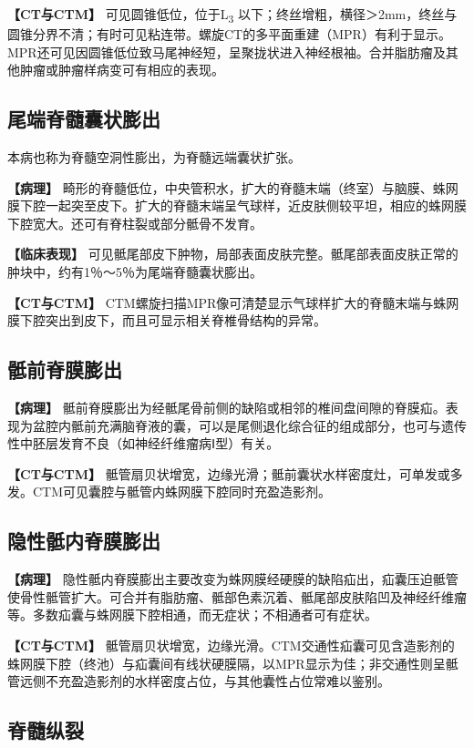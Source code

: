 \textbf{【CT与CTM】} 可见圆锥低位，位于L\textsubscript{3}
以下；终丝增粗，横径＞2mm，终丝与圆锥分界不清；有时可见粘连带。螺旋CT的多平面重建（MPR）有利于显示。MPR还可见因圆锥低位致马尾神经短，呈聚拢状进入神经根袖。合并脂肪瘤及其他肿瘤或肿瘤样病变可有相应的表现。

\subsection{尾端脊髓囊状膨出}

本病也称为脊髓空洞性膨出，为脊髓远端囊状扩张。

\textbf{【病理】}
畸形的脊髓低位，中央管积水，扩大的脊髓末端（终室）与脑膜、蛛网膜下腔一起突至皮下。扩大的脊髓末端呈气球样，近皮肤侧较平坦，相应的蛛网膜下腔宽大。还可有脊柱裂或部分骶骨不发育。

\textbf{【临床表现】}
可见骶尾部皮下肿物，局部表面皮肤完整。骶尾部表面皮肤正常的肿块中，约有1％～5％为尾端脊髓囊状膨出。

\textbf{【CT与CTM】}
CTM螺旋扫描MPR像可清楚显示气球样扩大的脊髓末端与蛛网膜下腔突出到皮下，而且可显示相关脊椎骨结构的异常。

\subsection{骶前脊膜膨出}

\textbf{【病理】}
骶前脊膜膨出为经骶尾骨前侧的缺陷或相邻的椎间盘间隙的脊膜疝。表现为盆腔内骶前充满脑脊液的囊，可以是尾侧退化综合征的组成部分，也可与遗传性中胚层发育不良（如神经纤维瘤病Ⅰ型）有关。

\textbf{【CT与CTM】}
骶管扇贝状增宽，边缘光滑；骶前囊状水样密度灶，可单发或多发。CTM可见囊腔与骶管内蛛网膜下腔同时充盈造影剂。

\subsection{隐性骶内脊膜膨出}

\textbf{【病理】}
隐性骶内脊膜膨出主要改变为蛛网膜经硬膜的缺陷疝出，疝囊压迫骶管使骨性骶管扩大。可合并有脂肪瘤、骶部色素沉着、骶尾部皮肤陷凹及神经纤维瘤等。多数疝囊与蛛网膜下腔相通，而无症状；不相通者可有症状。

\textbf{【CT与CTM】}
骶管扇贝状增宽，边缘光滑。CTM交通性疝囊可见含造影剂的蛛网膜下腔（终池）与疝囊间有线状硬膜隔，以MPR显示为佳；非交通性则呈骶管远侧不充盈造影剂的水样密度占位，与其他囊性占位常难以鉴别。

\subsection{脊髓纵裂}

